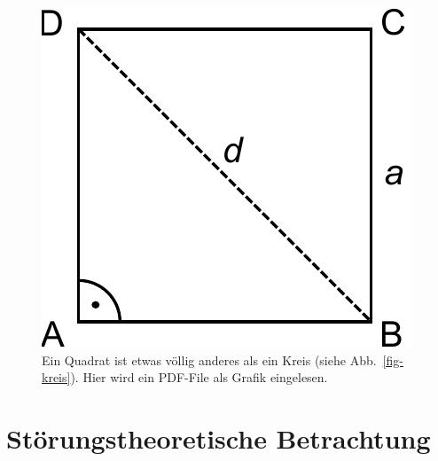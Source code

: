 \begin{figure}[h]
\includegraphics[width=\smallfigwidth]{bilder/quadrat.pdf}
\caption{Ein Quadrat ist etwas völlig anderes als ein Kreis (siehe Abb.\ \ref{fig-kreis}). 
Hier wird ein PDF-File als Grafik eingelesen.}
\label{fig-quadrat}
\end{figure} 



\section{Störungstheoretische Betrachtung}
